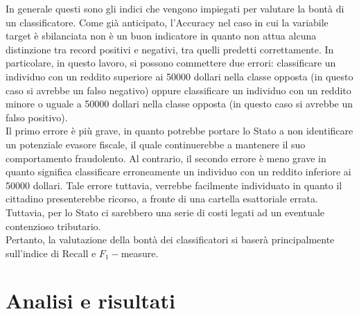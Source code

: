 \documentclass[fleqn,10pt]{SelfArx}
\begin{document}
In generale questi sono gli indici che vengono impiegati per valutare la bontà di un classificatore. Come già anticipato, l'Accuracy nel caso in cui la variabile target è sbilanciata non è un buon indicatore in quanto non attua alcuna distinzione tra record positivi e negativi, tra quelli predetti correttamente. In particolare, in questo lavoro, si possono commettere due errori: classificare un individuo con un reddito superiore ai \num{50000} dollari nella classe opposta (in questo caso si avrebbe un falso negativo) oppure classificare un individuo con un reddito minore o uguale a \num{50000} dollari nella classe opposta (in questo caso si avrebbe un falso positivo).\\
Il primo errore è più grave, in quanto potrebbe portare lo Stato a non identificare un potenziale evasore fiscale, il quale continuerebbe a mantenere il suo comportamento fraudolento. Al contrario, il secondo errore è meno grave in quanto significa classificare erroneamente un individuo con un reddito inferiore ai \num{50000} dollari. Tale errore tuttavia, verrebbe facilmente individuato in quanto il cittadino presenterebbe ricorso, a fronte di una cartella esattoriale errata. Tuttavia, per lo Stato ci sarebbero una serie di costi legati ad un eventuale contenzioso tributario.\\
Pertanto, la valutazione della bontà dei classificatori si baserà principalmente sull'indice di Recall e $F_1-$measure.
\section{Analisi e risultati}
\end{document}
